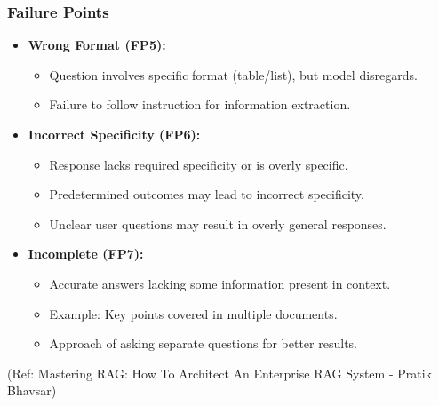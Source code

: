 \begin{frame}[fragile]\frametitle{Failure Points}
\begin{itemize}
  
  \item \textbf{Wrong Format (FP5):}
    \begin{itemize}
        \item Question involves specific format (table/list), but model disregards.
        \item Failure to follow instruction for information extraction.
    \end{itemize}
  
  \item \textbf{Incorrect Specificity (FP6):}
    \begin{itemize}
        \item Response lacks required specificity or is overly specific.
        \item Predetermined outcomes may lead to incorrect specificity.
        \item Unclear user questions may result in overly general responses.
    \end{itemize}
  
  \item \textbf{Incomplete (FP7):}
    \begin{itemize}
        \item Accurate answers lacking some information present in context.
        \item Example: Key points covered in multiple documents.
        \item Approach of asking separate questions for better results.
    \end{itemize}
\end{itemize}

{\tiny (Ref: Mastering RAG: How To Architect An Enterprise RAG System - Pratik Bhavsar)}

\end{frame}





